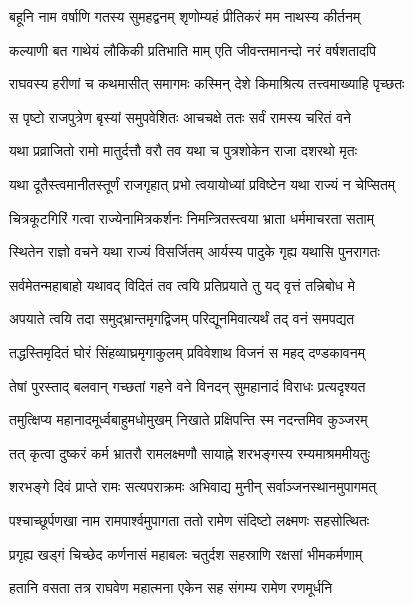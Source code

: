 
\twolineshloka
{बहूनि नाम वर्षाणि गतस्य सुमहद्वनम्}
{शृणोम्यहं प्रीतिकरं मम नाथस्य कीर्तनम्} %

\twolineshloka
{कल्याणी बत गाथेयं लौकिकी प्रतिभाति माम्}
{एति जीवन्तमानन्दो नरं वर्षशतादपि} %

\twolineshloka
{राघवस्य हरीणां च कथमासीत् समागमः}
{कस्मिन् देशे किमाश्रित्य तत्त्वमाख्याहि पृच्छतः} %

\twolineshloka
{स पृष्टो राजपुत्रेण बृस्यां समुपवेशितः}
{आचचक्षे ततः सर्वं रामस्य चरितं वने} %

\twolineshloka
{यथा प्रव्राजितो रामो मातुर्दत्तौ वरौ तव}
{यथा च पुत्रशोकेन राजा दशरथो मृतः} %

\twolineshloka
{यथा दूतैस्त्वमानीतस्तूर्णं राजगृहात् प्रभो}
{त्वयायोध्यां प्रविष्टेन यथा राज्यं न चेप्सितम्} %

\twolineshloka
{चित्रकूटगिरिं गत्वा राज्येनामित्रकर्शनः}
{निमन्त्रितस्त्वया भ्राता धर्ममाचरता सताम्} %

\twolineshloka
{स्थितेन राज्ञो वचने यथा राज्यं विसर्जितम्}
{आर्यस्य पादुके गृह्य यथासि पुनरागतः} %

\twolineshloka
{सर्वमेतन्महाबाहो यथावद् विदितं तव}
{त्वयि प्रतिप्रयाते तु यद् वृत्तं तन्निबोध मे} %

\twolineshloka
{अपयाते त्वयि तदा समुद्भ्रान्तमृगद्विजम्}
{परिद्यूनमिवात्यर्थं तद् वनं समपद्यत} %

\twolineshloka
{तद्धस्तिमृदितं घोरं सिंहव्याघ्रमृगाकुलम्}
{प्रविवेशाथ विजनं स महद् दण्डकावनम्} %

\twolineshloka
{तेषां पुरस्ताद् बलवान् गच्छतां गहने वने}
{विनदन् सुमहानादं विराधः प्रत्यदृश्यत} %

\twolineshloka
{तमुत्क्षिप्य महानादमूर्ध्वबाहुमधोमुखम्}
{निखाते प्रक्षिपन्ति स्म नदन्तमिव कुञ्जरम्} %

\twolineshloka
{तत् कृत्वा दुष्करं कर्म भ्रातरौ रामलक्ष्मणौ}
{सायाह्ने शरभङ्गस्य रम्यमाश्रममीयतुः} %

\twolineshloka
{शरभङ्गे दिवं प्राप्ते रामः सत्यपराक्रमः}
{अभिवाद्य मुनीन् सर्वाञ्जनस्थानमुपागमत्} %

\twolineshloka
{पश्चाच्छूर्पणखा नाम रामपार्श्वमुपागता}
{ततो रामेण संदिष्टो लक्ष्मणः सहसोत्थितः} %

\twolineshloka
{प्रगृह्य खड्गं चिच्छेद कर्णनासं महाबलः}
{चतुर्दश सहस्राणि रक्षसां भीमकर्मणाम्} %

\twolineshloka
{हतानि वसता तत्र राघवेण महात्मना}
{एकेन सह संगम्य रामेण रणमूर्धनि} %

